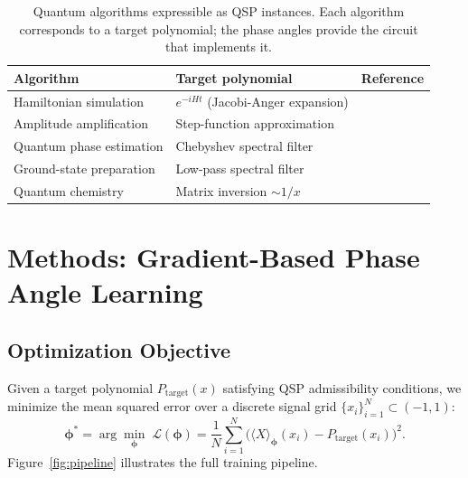 \documentclass[11pt,a4paper]{article}
\begin{document}
\begin{table}[ht]
\centering
\small
\begin{tabularx}{\textwidth}{@{} l X l @{}}
  \toprule
  \textbf{Algorithm} & \textbf{Target polynomial} & \textbf{Reference} \\
  \midrule
  Hamiltonian simulation    & $e^{-iHt}$ (Jacobi-Anger expansion)   & \cite{low2019hamiltonian} \\
  Amplitude amplification   & Step-function approximation            & \cite{martyn2021grand} \\
  Quantum phase estimation  & Chebyshev spectral filter              & \cite{martyn2021grand} \\
  Ground-state preparation  & Low-pass spectral filter               & \cite{dong2021efficient} \\
  Quantum chemistry         & Matrix inversion ${\sim}1/x$           & \cite{babbush2018encoding} \\
  \bottomrule
\end{tabularx}
\caption{Quantum algorithms expressible as QSP instances. Each algorithm corresponds to a target polynomial; the phase angles provide the circuit that implements it.}
\label{tab:algorithms}
\end{table}

\section{Methods: Gradient-Based Phase Angle Learning}

\subsection{Optimization Objective}

Given a target polynomial $P_{\mathrm{target}}(x)$ satisfying QSP admissibility conditions, we minimize the mean squared error over a discrete signal grid $\{x_i\}_{i=1}^N \subset (-1,1)$:
\begin{equation}
  \boldsymbol{\phi}^* = \arg\min_{\boldsymbol{\phi}}\;\mathcal{L}(\boldsymbol{\phi})
  = \frac{1}{N}\sum_{i=1}^{N}\bigl(\langle X\rangle_{\boldsymbol{\phi}}(x_i) - P_{\mathrm{target}}(x_i)\bigr)^2.
  \label{eq:loss}
\end{equation}
Figure~\ref{fig:pipeline} illustrates the full training pipeline.
\end{document}
